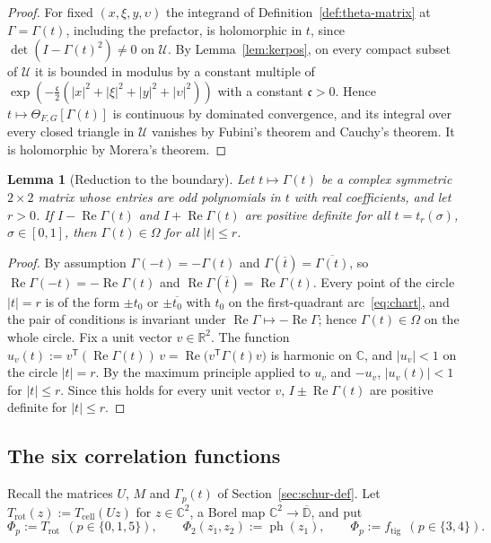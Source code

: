 \documentclass[11pt,reqno]{amsart}
\newtheorem{lemma}[theorem]{Lemma}
\theoremstyle{definition}
\numberwithin{equation}{section}
\newcommand{\C}{\mathbb{C}}
\newcommand{\R}{\mathbb{R}}
\newcommand{\D}{\mathbb{D}}
\newcommand{\ph}{\operatorname{ph}}
\newcommand{\Om}{\Omega}
\newcommand{\Tcell}{T_{\mathrm{cell}}}
\newcommand{\Trot}{T_{\mathrm{rot}}}
\newcommand{\ftig}{f_{\mathrm{tig}}}
\DeclareMathOperator{\RePart}{Re}
\begin{document}
\begin{proof}
For fixed $(x,\xi,y,\upsilon)$ the integrand of Definition~\ref{def:theta-matrix} at $\Gamma=\Gamma(t)$, including the prefactor, is holomorphic in $t$, since $\det(I-\Gamma(t)^2)\ne0$ on $\mathcal{U}$. By Lemma~\ref{lem:kerpos}, on every compact subset of $\mathcal{U}$ it is bounded in modulus by a constant multiple of $\exp(-\frac{\mathfrak{c}}2(|x|^2+|\xi|^2+|y|^2+|\upsilon|^2))$ with a constant $\mathfrak{c}>0$. Hence $t\mapsto\Theta_{F,G}[\Gamma(t)]$ is continuous by dominated convergence, and its integral over every closed triangle in $\mathcal{U}$ vanishes by Fubini's theorem and Cauchy's theorem. It is holomorphic by Morera's theorem.
\end{proof}

\begin{lemma}[Reduction to the boundary]\label{lem:maxprinc}
Let $t\mapsto\Gamma(t)$ be a complex symmetric $2\times2$ matrix whose entries are odd polynomials in $t$ with real coefficients, and let $r>0$. If $I-\RePart\Gamma(t)$ and $I+\RePart\Gamma(t)$ are positive definite for all $t=t_r(\sigma)$, $\sigma\in[0,1]$, then $\Gamma(t)\in\Om$ for all $|t|\le r$.
\end{lemma}

\begin{proof}
By assumption $\Gamma(-t)=-\Gamma(t)$ and $\Gamma(\overline{t})=\overline{\Gamma(t)}$, so $\RePart\Gamma(-t)=-\RePart\Gamma(t)$ and $\RePart\Gamma(\overline t)=\RePart\Gamma(t)$. Every point of the circle $|t|=r$ is of the form $\pm t_0$ or $\pm\overline{t_0}$ with $t_0$ on the first-quadrant arc~\eqref{eq:chart}, and the pair of conditions is invariant under $\RePart\Gamma\mapsto-\RePart\Gamma$; hence $\Gamma(t)\in\Om$ on the whole circle. Fix a unit vector $v\in\R^2$. The function $u_v(t):=v^{\mathsf{T}}(\RePart\Gamma(t))\,v=\RePart\bigl(v^{\mathsf{T}}\Gamma(t)v\bigr)$ is harmonic on $\C$, and $|u_v|<1$ on the circle $|t|=r$. By the maximum principle applied to $u_v$ and $-u_v$, $|u_v(t)|<1$ for $|t|\le r$. Since this holds for every unit vector $v$, $I\pm\RePart\Gamma(t)$ are positive definite for $|t|\le r$.
\end{proof}

\subsection{The six correlation functions}
Recall the matrices $U$, $M$ and $\Gamma_p(t)$ of Section~\ref{sec:schur-def}. Let $\Trot(z):=\Tcell(Uz)$ for $z\in\C^2$, a Borel map $\C^2\to\overline{\D}$, and put
\[
  \Phi_p:=\Trot\ \ (p\in\{0,1,5\}),\qquad \Phi_2(z_1,z_2):=\ph(z_1),\qquad \Phi_p:=\ftig\ \ (p\in\{3,4\}).
\]
\end{document}
